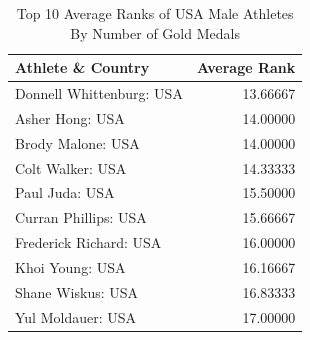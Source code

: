 \documentclass[
  10.5pt,
  letterpaper,
  DIV=11,
  numbers=noendperiod]{scrartcl}
\begin{document}
\begin{table}[H]

\caption{Top 10 Average Ranks of USA Male Athletes By Number of Gold Medals}
\centering
\fontsize{8}{10}\selectfont
\begin{tabular}[t]{l|r}
\hline
Athlete \& Country & Average Rank\\
\hline
Donnell Whittenburg: USA & 13.66667\\
\hline
Asher Hong: USA & 14.00000\\
\hline
Brody Malone: USA & 14.00000\\
\hline
Colt Walker: USA & 14.33333\\
\hline
Paul Juda: USA & 15.50000\\
\hline
Curran Phillips: USA & 15.66667\\
\hline
Frederick Richard: USA & 16.00000\\
\hline
Khoi Young: USA & 16.16667\\
\hline
Shane Wiskus: USA & 16.83333\\
\hline
Yul Moldauer: USA & 17.00000\\
\hline
\end{tabular}
\end{table}
\end{document}

